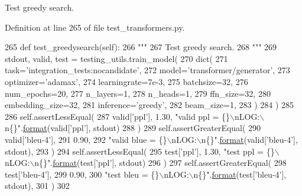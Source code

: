 \begin{DoxyVerb}Test greedy search.
\end{DoxyVerb}
 

Definition at line 265 of file test\+\_\+transformers.\+py.


\begin{DoxyCode}
265     \textcolor{keyword}{def }test\_greedysearch(self):
266         \textcolor{stringliteral}{"""}
267 \textcolor{stringliteral}{        Test greedy search.}
268 \textcolor{stringliteral}{        """}
269         stdout, valid, test = testing\_utils.train\_model(
270             dict(
271                 task=\textcolor{stringliteral}{'integration\_tests:nocandidate'},
272                 model=\textcolor{stringliteral}{'transformer/generator'},
273                 optimizer=\textcolor{stringliteral}{'adamax'},
274                 learningrate=7e-3,
275                 batchsize=32,
276                 num\_epochs=20,
277                 n\_layers=1,
278                 n\_heads=1,
279                 ffn\_size=32,
280                 embedding\_size=32,
281                 inference=\textcolor{stringliteral}{'greedy'},
282                 beam\_size=1,
283             )
284         )
285 
286         self.assertLessEqual(
287             valid[\textcolor{stringliteral}{'ppl'}], 1.30, \textcolor{stringliteral}{"valid ppl = \{\}\(\backslash\)nLOG:\(\backslash\)n\{\}"}.\hyperlink{namespaceparlai_1_1chat__service_1_1services_1_1messenger_1_1shared__utils_a32e2e2022b824fbaf80c747160b52a76}{format}(valid[\textcolor{stringliteral}{'ppl'}], stdout)
288         )
289         self.assertGreaterEqual(
290             valid[\textcolor{stringliteral}{'bleu-4'}],
291             0.90,
292             \textcolor{stringliteral}{"valid blue = \{\}\(\backslash\)nLOG:\(\backslash\)n\{\}"}.\hyperlink{namespaceparlai_1_1chat__service_1_1services_1_1messenger_1_1shared__utils_a32e2e2022b824fbaf80c747160b52a76}{format}(valid[\textcolor{stringliteral}{'bleu-4'}], stdout),
293         )
294         self.assertLessEqual(
295             test[\textcolor{stringliteral}{'ppl'}], 1.30, \textcolor{stringliteral}{"test ppl = \{\}\(\backslash\)nLOG:\(\backslash\)n\{\}"}.\hyperlink{namespaceparlai_1_1chat__service_1_1services_1_1messenger_1_1shared__utils_a32e2e2022b824fbaf80c747160b52a76}{format}(test[\textcolor{stringliteral}{'ppl'}], stdout)
296         )
297         self.assertGreaterEqual(
298             test[\textcolor{stringliteral}{'bleu-4'}],
299             0.90,
300             \textcolor{stringliteral}{"test bleu = \{\}\(\backslash\)nLOG:\(\backslash\)n\{\}"}.\hyperlink{namespaceparlai_1_1chat__service_1_1services_1_1messenger_1_1shared__utils_a32e2e2022b824fbaf80c747160b52a76}{format}(test[\textcolor{stringliteral}{'bleu-4'}], stdout),
301         )
302 
\end{DoxyCode}
